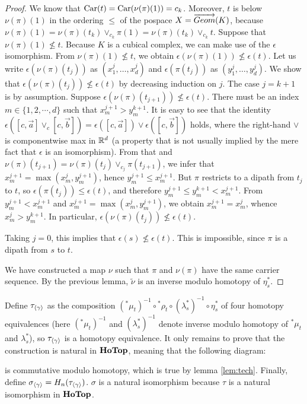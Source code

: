 \begin{proof}
  We know that $\text{Car}(t) = \text{Car}(\nu(\pi)(1)) = c_k$.
  Moreover, $t$ is below $\nu(\pi)(1)$ in the ordering $\leq$ of the
  pospace $X = \overrightarrow{Geom}(K)$, because $\nu(\pi)(1) = \nu(\pi)(t_k)
  \vee_{c_k} \pi(1) = \nu(\pi)(t_k) \vee_{c_k} t$. Suppose that
  $\nu(\pi)(1) \not\leq t$.  Because $K$ is a cubical complex, we can
  make use of the $\epsilon$ isomorphism.  From $\nu (\pi) (1) \not
  \leq t$, we obtain $\epsilon(\nu(\pi)(1)) \not\leq \epsilon(t)$.
  Let us write $\epsilon(\nu(\pi)(t_j))$ as $(x_1^j,\ldots,x_d^j)$ and
  $\epsilon(\pi(t_j))$ as $(y_1^j,\ldots,y_d^j)$.  We show that
  $\epsilon(\nu(\pi)(t_j)) \not\leq \epsilon(t)$ by decreasing
  induction on $j$. The case $j=k+1$ is by assumption. Suppose
  $\epsilon(\nu(\pi)(t_{j+1})) \not\leq \epsilon(t)$.  There must be
  an index $m \in \{1, 2, \cdots, d\}$ such that $x_m^{j+1} >
  y_m^{k+1}$.  It is easy to see that the identity $\epsilon ([c, \vec
  a] \vee_c [c, \vec b]) = \epsilon ([c, \vec a]) \vee \epsilon ([c,
  \vec b])$ holds, where the right-hand $\vee$ is componentwise max in
  $\mathbb{R}^d$ (a property that is not usually implied by the mere fact
  that $\epsilon$ is an isomorphism).  From that and
  $\nu(\pi)(t_{j+1}) = \nu(\pi)(t_j) \vee_{c_j} \pi(t_{j+1})$, we
  infer that $x_m^{j+1} = \max(x_m^j,y_m^{j+1})$, hence $y_m^{j+1}
  \leq x_m^{j+1}$.  But $\pi$ restricts to a dipath from $t_j$ to $t$, so
  $\epsilon(\pi(t_j)) \leq \epsilon(t)$, and therefore $y_m^{j+1} \leq
  y_m^{k+1} < x_m^{j+1}$.  From $y_m^{j+1} < x_m^{j+1}$ and $x_m^{j+1}
  = \max(x_m^j,y_m^{j+1})$, we obtain $x_m^{j+1} = x_m^j$, whence
  $x_m^j > y_m^{k+1}$.  In particular, $\epsilon(\nu(\pi)(t_j))
  \not\leq \epsilon(t)$.
  
  Taking $j = 0$, this implies that $\epsilon(s) \not\leq
  \epsilon(t)$.  This is impossible, since $\pi$ is a dipath from $s$ to $t$.

  We have constructed a map $\nu$ such that $\pi$ and $\nu(\pi)$ have
 the same carrier sequence.  By the previous lemma, $\tilde{\nu}$ is an inverse modulo homotopy of $\eta_s^*$.
\end{proof}


Define $\tau_{\langle\gamma\rangle}$ as the composition
$({^*\mu_t})^{-1}\circ {^*\rho_t}\circ(\lambda_s^*)^{-1}\circ \eta_s^*$ of four homotopy equivalences (here $({^*\mu_t})^{-1}$ and $(\lambda_s^*)^{-1}$ denote inverse modulo homotopy of ${^*\mu_t}$ and $\lambda_s^*$), so $\tau_{\langle\gamma\rangle}$ is a homotopy equivalence. It only remains to prove that the construction is natural in $\textbf{HoTop}$, meaning that the following diagram: 
    \begin{figure}[H]
  \centering
    		
\end{figure}
\noindent is commutative modulo homotopy, which is true by lemma \ref{lem:tech}. Finally, define $\sigma_{\langle\gamma\rangle} = H_n(\tau_{\langle\gamma\rangle})$. $\sigma$ is a natural isomorphism because $\tau$ is a natural isomorphism in $\textbf{HoTop}$.

